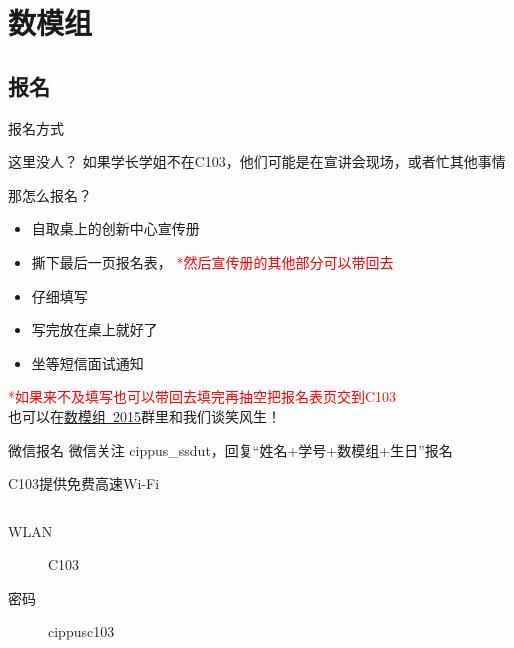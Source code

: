 \documentclass{beamer}
\begin{document}
\section{数模组}
\subsection{报名}
\begin{frame}{报名方式}\label{signin}
	\begin{exampleblock}{这里没人？}
		如果学长学姐不在C103，他们可能是在宣讲会现场，或者忙其他事情
	\end{exampleblock}
	
	\begin{alertblock}{那怎么报名？}
		\begin{itemize}
			\item 自取桌上的创新中心宣传册 \faClone
			\item 撕下最后一页报名表\faTable ， \textcolor{red}{*然后宣传册的其他部分可以带回去}
			\item 仔细填写\faPencil
			\item 写完放在桌上就好了\faPaperclip
			\item 坐等短信面试通知\faPaperPlaneO
		\end{itemize}
		\textcolor{red}{*如果来不及填写也可以带回去填完再抽空把报名表页交到C103} \\
		也可以在\textcolor{blue}{\hyperlink{qun}{\faQq 数模组~2015}}群里和我们谈笑风生！
	\end{alertblock}
	
	\begin{block}{微信报名}
		微信关注\faWechat{ } cippus\_ssdut，回复“姓名+学号+数模组+生日”报名 %
	\end{block}
	
\end{frame}

\begin{frame}{C103提供免费高速Wi-Fi\faWifi}
\begin{columns}
{\LARGE 
    \begin{description}
        \item[WLAN] C103
        \item[密码] cippusc103
    \end{description}
}
\end{columns}
\end{frame}
\end{document}
